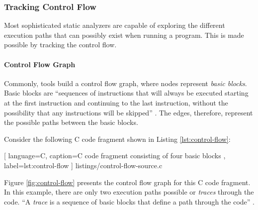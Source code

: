 \subsubsection{Tracking Control Flow}

Most sophisticated static analyzers are capable of exploring the different execution paths that can possibly exist when running a program. This is made possible by tracking the control flow.

\paragraph{Control Flow Graph} Commonly, tools build a control flow graph, where nodes represent \emph{basic blocks}. Basic blocks are ``sequences of instructions that will always be executed starting at the first instruction and continuing to the last instruction, without the possibility that any instructions will be skipped'' \cite{chess2007secure}. The edges, therefore, represent the possible paths between the basic blocks.

Consider the following C code fragment shown in Listing \ref{lst:control-flow}:

\vspace{0.5cm}


    [
        language=C,
        caption=C code fragment consisting of four basic blocks \cite{chess2007secure},
        label=lst:control-flow
    ]
    {listings/control-flow-source.c}

Figure \ref{fig:control-flow} presents the control flow graph for this C code fragment. In this example, there are only two execution paths possible or \emph{traces} through the code. ``A \emph{trace} is a sequence of basic blocks that define a path through the code'' \cite{chess2007secure}.

\clearpage


